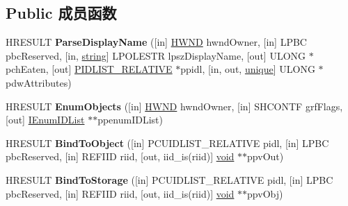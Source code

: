 \subsection*{Public 成员函数}
\begin{DoxyCompactItemize}
\item 
\mbox{\label{interface_i_shell_folder_a82d388b2df30481bb5256c1bcda486e0}} 
H\+R\+E\+S\+U\+LT {\bfseries Parse\+Display\+Name} (\mbox{[}in\mbox{]} \hyperlink{interfacevoid}{H\+W\+ND} hwnd\+Owner, \mbox{[}in\mbox{]} L\+P\+BC pbc\+Reserved, \mbox{[}in, \hyperlink{structstring}{string}\mbox{]} L\+P\+O\+L\+E\+S\+TR lpsz\+Display\+Name, \mbox{[}out\mbox{]} U\+L\+O\+NG $\ast$pch\+Eaten, \mbox{[}out\mbox{]} \hyperlink{struct___i_t_e_m_i_d_l_i_s_t___r_e_l_a_t_i_v_e}{P\+I\+D\+L\+I\+S\+T\+\_\+\+R\+E\+L\+A\+T\+I\+VE} $\ast$ppidl, \mbox{[}in, out, \hyperlink{interfaceunique}{unique}\mbox{]} U\+L\+O\+NG $\ast$pdw\+Attributes)
\item 
\mbox{\label{interface_i_shell_folder_a83d00f9d050c2f157c8ab4ae53d1e6da}} 
H\+R\+E\+S\+U\+LT {\bfseries Enum\+Objects} (\mbox{[}in\mbox{]} \hyperlink{interfacevoid}{H\+W\+ND} hwnd\+Owner, \mbox{[}in\mbox{]} S\+H\+C\+O\+N\+TF grf\+Flags, \mbox{[}out\mbox{]} \hyperlink{interface_i_enum_i_d_list}{I\+Enum\+I\+D\+List} $\ast$$\ast$ppenum\+I\+D\+List)
\item 
\mbox{\label{interface_i_shell_folder_a8c351e714ac5b7faceb3da28f5776b63}} 
H\+R\+E\+S\+U\+LT {\bfseries Bind\+To\+Object} (\mbox{[}in\mbox{]} P\+C\+U\+I\+D\+L\+I\+S\+T\+\_\+\+R\+E\+L\+A\+T\+I\+VE pidl, \mbox{[}in\mbox{]} L\+P\+BC pbc\+Reserved, \mbox{[}in\mbox{]} R\+E\+F\+I\+ID riid, \mbox{[}out, iid\+\_\+is(riid)\mbox{]} \hyperlink{interfacevoid}{void} $\ast$$\ast$ppv\+Out)
\item 
\mbox{\label{interface_i_shell_folder_ae3279163ba52d8b4cc6ab139f950bd3f}} 
H\+R\+E\+S\+U\+LT {\bfseries Bind\+To\+Storage} (\mbox{[}in\mbox{]} P\+C\+U\+I\+D\+L\+I\+S\+T\+\_\+\+R\+E\+L\+A\+T\+I\+VE pidl, \mbox{[}in\mbox{]} L\+P\+BC pbc\+Reserved, \mbox{[}in\mbox{]} R\+E\+F\+I\+ID riid, \mbox{[}out, iid\+\_\+is(riid)\mbox{]} \hyperlink{interfacevoid}{void} $\ast$$\ast$ppv\+Obj)
\item 
\mbox{\label{interface_i_shell_folder_ac877c64d3c3ca4cbd88497ec4b6e06e0}} 
$$
\end{DoxyCompactItemize}
